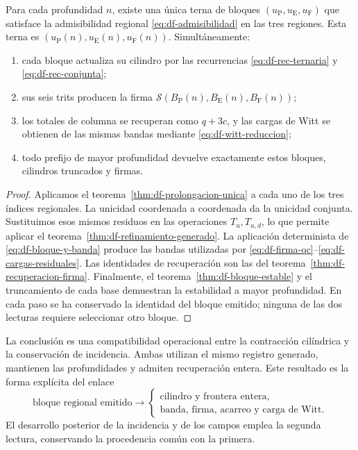 \begin{theorem}
\label{thm:df-composicion-conjunta}
Para cada profundidad \(n\), existe una única terna de bloques
\((u_{\mathrm P},u_{\mathrm E},u_{\mathrm F})\) que satisface la
admisibilidad regional \eqref{eq:df-admisibilidad} en las tres regiones.
Esta terna es \((u_{\mathrm P}(n),u_{\mathrm E}(n),u_{\mathrm F}(n))\).
Simultáneamente:
\begin{enumerate}
\item cada bloque actualiza su cilindro por las recurrencias
\eqref{eq:df-rec-ternaria} y \eqref{eq:df-rec-conjunta};
\item sus seis trits producen la firma
\(\mathcal S(B_{\mathrm P}(n),B_{\mathrm E}(n),B_{\mathrm F}(n))\);
\item los totales de columna se recuperan como \(q+3c\), y las cargas
de Witt se obtienen de las mismas bandas mediante
\eqref{eq:df-witt-reduccion};
\item todo prefijo de mayor profundidad devuelve exactamente estos
bloques, cilindros truncados y firmas.
\end{enumerate}
\end{theorem}

\begin{proof}
Aplicamos el teorema~\ref{thm:df-prolongacion-unica} a cada uno de los tres
índices regionales. La unicidad coordenada a coordenada da la unicidad
conjunta. Sustituimos esos mismos residuos en las operaciones
\(T_u,T_{u,d}\), lo que permite aplicar el
teorema~\ref{thm:df-refinamiento-generado}. La aplicación determinista de
\eqref{eq:df-bloque-y-banda} produce las bandas utilizadas por
\eqref{eq:df-firma-qc}--\eqref{eq:df-cargas-residuales}. Las identidades
de recuperación son las del teorema~\ref{thm:df-recuperacion-firma}.
Finalmente, el teorema~\ref{thm:df-bloque-estable} y el truncamiento de
cada base demuestran la estabilidad a mayor profundidad. En cada paso se
ha conservado la identidad del bloque emitido; ninguna de las dos
lecturas requiere seleccionar otro bloque.
\end{proof}

La conclusión es una compatibilidad operacional entre la contracción
cilíndrica y la conservación de incidencia. Ambas utilizan el mismo
registro generado, mantienen las profundidades y admiten recuperación
entera. Este resultado es la forma explícita del enlace
\[
 \text{bloque regional emitido}
 \longrightarrow
 \begin{cases}
 \text{cilindro y frontera entera},\\
 \text{banda, firma, acarreo y carga de Witt}.
 \end{cases}
\]
El desarrollo posterior de la incidencia y de los campos emplea la
segunda lectura, conservando la procedencia común con la primera.


